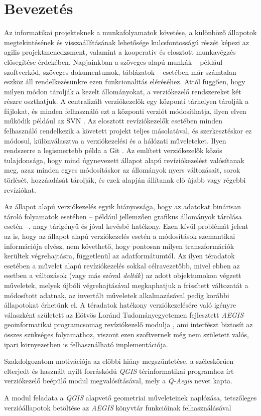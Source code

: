 \chapter{Bevezetés}
\label{ch:intro}

Az informatikai projekteknek a munkafolyamatok követése, a különböző állapotok megtekintésének és visszaállításának lehetősége kulcsfontosságú részét képezi az agilis projektmenedzsment, valamint a kooperatív és elosztott munkavégzés elősegítése érdekében. Napjainkban a szöveges alapú munkák -- például szoftverkód, szöveges dokumentumok, táblázatok -- esetében már számtalan eszköz áll rendelkezésünkre ezen funkcionalitás eléréséhez. Attól függően, hogy milyen módon tárolják a kezelt állományokat, a verziókezelő rendszereket két részre oszthatjuk. A centralizált verziókezelők egy központi tárhelyen tárolják a fájlokat, és minden felhasználó ezt a központi verziót módosíthatja, ilyen elven működik például az SVN \cite{svn}. Az elosztott revíziókezelők esetében minden felhasználó rendelkezik a követett projekt teljes másolatával, és szerkesztéskor ez módosul, különválasztva a verziókezelési és a hálózati műveleteket. Ilyen rendszerre a legismertebb példa a Git \cite{git}.
Az említett verziókezelők közös tulajdonsága, hogy mind úgynevezett állapot alapú revíziókezelést valósítanak meg, azaz minden egyes módosításkor az állományok nyers változásait, sorok törlését, hozzáadását tárolják, és ezek alapján állítanak elő újabb vagy régebbi revíziókat.

Az állapot alapú verziókezelés egyik hiányossága, hogy az adatokat binárisan tároló folyamatok esetében -- például jellemzően grafikus állományok tárolása esetén --, nagy tárigényű és jóval kevésbé hatékony. Ezen kívül problémát jelent az is, hogy az állapot alapú verziókezelés esetén a módosítások szemantikai információja elvész, nem követhető, hogy pontosan milyen transzformációk kerültek végrehajtásra, függetlenül az adatformátumtól.
Az ilyen téradatok esetében a művelet alapú revíziókezelés sokkal célravezetőbb, mivel ebben az esetben a változások (vagy más szóval \emph{delták}) az adott objektumokon végzett műveletek, melyek újbóli végrehajtásával megkaphatjuk a frissített változatát a módosított adatnak, az invertált műveletek alkalmazásával pedig korábbi állapotokat érhetünk el.
A téradatok hatékony verziókezelésére való igényre válaszként született az Eötvös Loránd Tudományegyetemen fejlesztett \emph{AEGIS} geoinformatikai programcsomag \cite{giachetta2013aegis, aegis} revíziókezelő modulja \cite{cserep2013versioning,cserep2015operation}, ami interfészt biztosít az összes szükséges folyamathoz, viszont ezen szoftvernek még nem született valós, ipari környezetben is felhasználható implementációja.

Szakdolgozatom motivációja az előbbi hiány megszüntetése, a széleskörűen elterjedt és használt nyílt forráskódú \emph{QGIS} térinformatikai programhoz \cite{qgis} írt verziókezelő beépülő modul megvalósításával, mely a \emph{Q-Aegis} nevet kapta.

A modul feladata a \emph{QGIS} alapvető geometriai műveleteinek naplózása, tetszőleges verzióállapotok betöltése az \emph{AEGIS} könyvtár funkcióinak felhasználásával

